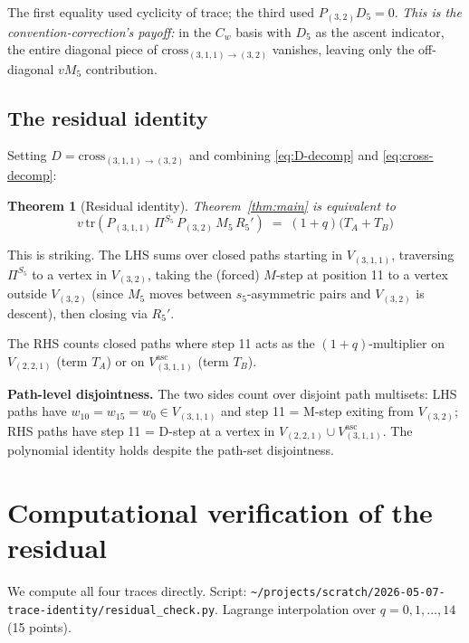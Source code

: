 \documentclass[11pt]{article}
\newtheorem{theorem}{Theorem}
\theoremstyle{definition}
\begin{document}
\noindent The first equality used cyclicity of trace; the third used $P_{(3,2)} D_5 = 0$. \emph{This is the convention-correction's payoff:} in the $C_w$ basis with $D_5$ as the ascent indicator, the entire diagonal piece of $\mathrm{cross}_{(3,1,1)\to(3,2)}$ vanishes, leaving only the off-diagonal $vM_5$ contribution.

\subsection*{The residual identity}

Setting $D = \mathrm{cross}_{(3,1,1)\to(3,2)}$ and combining \eqref{eq:D-decomp} and \eqref{eq:cross-decomp}:

\begin{theorem}[Residual identity]\label{thm:residual}
Theorem~\ref{thm:main} is equivalent to
\begin{equation}\label{eq:residual}
\boxed{
\;v\,\mathrm{tr}(P_{(3,1,1)}\, \Pi^{S_5}\, P_{(3,2)}\, M_5\, R_5') \;=\; (1+q)\bigl(T_A + T_B\bigr)\;
}
\end{equation}
\end{theorem}

This is striking. The LHS sums over closed paths starting in $V_{(3,1,1)}$, traversing $\Pi^{S_5}$ to a vertex in $V_{(3,2)}$, taking the (forced) $M$-step at position 11 to a vertex outside $V_{(3,2)}$ (since $M_5$ moves between $s_5$-asymmetric pairs and $V_{(3,2)}$ is descent), then closing via $R_5'$.

The RHS counts closed paths where step 11 acts as the $(1+q)$-multiplier on $V_{(2,2,1)}$ (term $T_A$) or on $V_{(3,1,1)}^{\mathrm{asc}}$ (term $T_B$).

\textbf{Path-level disjointness.} The two sides count over disjoint path multisets: LHS paths have $w_{10} = w_{15} = w_0 \in V_{(3,1,1)}$ and step 11 = M-step exiting from $V_{(3,2)}$; RHS paths have step 11 = D-step at a vertex in $V_{(2,2,1)} \cup V_{(3,1,1)}^{\mathrm{asc}}$. The polynomial identity holds despite the path-set disjointness.

\section{Computational verification of the residual}\label{sec:numerics}

We compute all four traces directly. Script: \texttt{\textasciitilde/projects/scratch/2026-05-07-trace-identity/residual\_check.py}. Lagrange interpolation over $q = 0, 1, \ldots, 14$ (15 points).
\end{document}
